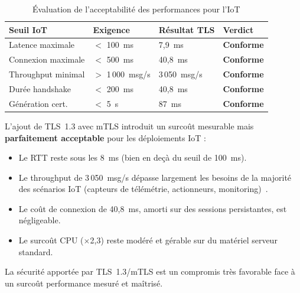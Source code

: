 \begin{table}[H]
\centering
\caption{Évaluation de l'acceptabilité des performances pour l'IoT}
\label{tab:acceptability}
\begin{tabular}{llll}
\toprule
\textbf{Seuil IoT} & \textbf{Exigence} & \textbf{Résultat TLS} & \textbf{Verdict} \\
\midrule
Latence maximale & $<$ 100~ms & 7,9~ms & \textcolor{green!60!black}{\textbf{Conforme}} \\
Connexion maximale & $<$ 500~ms & 40,8~ms & \textcolor{green!60!black}{\textbf{Conforme}} \\
Throughput minimal & $>$ 1\,000~msg/s & 3\,050~msg/s & \textcolor{green!60!black}{\textbf{Conforme}} \\
Durée handshake & $<$ 200~ms & 40,8~ms & \textcolor{green!60!black}{\textbf{Conforme}} \\
Génération cert. & $<$ 5~s & 87~ms & \textcolor{green!60!black}{\textbf{Conforme}} \\
\bottomrule
\end{tabular}
\end{table}

\begin{resultbox}
L'ajout de TLS~1.3 avec mTLS introduit un surcoût mesurable mais \textbf{parfaitement acceptable} pour les déploiements IoT :
\begin{itemize}
  \item Le RTT reste sous les 8~ms (bien en deçà du seuil de 100~ms).
  \item Le throughput de 3\,050~msg/s dépasse largement les besoins de la majorité des scénarios IoT (capteurs de télémétrie, actionneurs, monitoring)~\cite{nist_sp800213}.
  \item Le coût de connexion de 40,8~ms, amorti sur des sessions persistantes, est négligeable.
  \item Le surcoût CPU ($\times$2,3) reste modéré et gérable sur du matériel serveur standard.
\end{itemize}

La sécurité apportée par TLS~1.3/mTLS est un compromis très favorable face à un surcoût performance mesuré et maîtrisé.
\end{resultbox}
